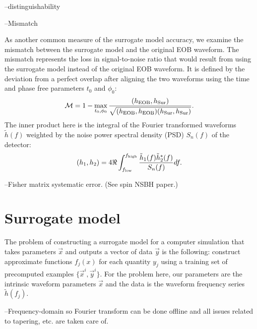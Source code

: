 \documentclass[prd,aps,letter,twocolumn,floatfix,notitlepage]{revtex4-1}
\begin{document}
--distinguishability

--Mismatch

As another common measure of the surrogate model accuracy, we examine the mismatch between 
the surrogate model and the original EOB waveform.
The mismatch represents the loss in signal-to-noise ratio that would result 
from using the surrogate model instead of the original EOB waveform. 
It is defined by the deviation from a perfect overlap after aligning the two waveforms
using the time and phase free parameters $t_0$ and $\phi_0$:
\begin{equation}
\mathcal{M} = 1 - \max_{t_0, \phi_0} \frac{(h_{\rm EOB}, h_{\rm Sur})} {\sqrt{(h_{\rm EOB}, h_{\rm EOB}) (h_{\rm Sur}, h_{\rm Sur})}}.
\end{equation}
The inner product here  is the integral of the Fourier transformed waveforms $\tilde h(f)$ weighted by the noise power spectral 
density (PSD) $S_n(f)$ of the detector:
\begin{equation}
(h_1, h_2) = 4 \Re \int_{f_{\rm low}}^{f_{\rm high}} \frac{\tilde h_1(f) \tilde h^*_2(f)} {S_n(f)} df.
\end{equation}

--Fisher matrix systematic error. (See spin NSBH paper.)

\section{Surrogate model}

The problem of constructing a surrogate model for a computer simulation that takes parameters 
$\vec x$ and outputs a vector of data $\vec y$ is the following: construct approximate functions $f_j(x)$
for each quantity $y_j$ using a training set of precomputed examples $\{\vec x^i, \vec y^i\}$. For the problem here, 
our parameters are the intrinsic waveform parameters $\vec x$ and the data is the waveform frequency series $\tilde h(f_j)$. 

--Frequency-domain so Fourier transform can be done offline and all issues related to tapering, etc. are taken care of.
\end{document}
